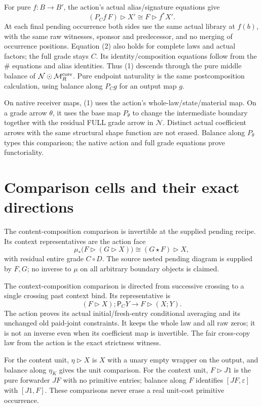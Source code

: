 \documentclass[11pt]{article}
\begin{document}
For pure $f:B\to B'$, the action's actual alias/signature equations give
\[
 (P_Cf\,F)\triangleright X'\cong
                F\triangleright f^*X'.                 \tag{2}
\]
At each final pending occurrence both sides use the same actual library at $f(b)$, with the same raw witnesses, sponsor and predecessor, and no merging of occurrence positions. Equation (2) also holds for complete laws and actual factors; the full grade stays $C$. Its identity/composition equations follow from the $\# $ equations and alias identities. Thus (1) descends through the pure middle balance of $\mathcal N\odot\mathcal M_R^{\rm core}$. Pure endpoint naturality is the same postcomposition calculation, using balance along $P_Cg$ for an output map $g$.

On native receiver maps, (1) uses the action's whole-law/state/material map. On a grade arrow $\theta$, it uses the base map $P_\theta$ to change the intermediate boundary together with the residual FULL grade arrow in $\mathcal N$. Distinct actual coefficient arrows with the same structural shape function are not erased. Balance along $P_\theta$ types this comparison; the native action and full grade equations prove functoriality.

\section{Comparison cells and their exact directions}
The content-composition comparison is invertible at the supplied pending recipe. Its context representatives are the action face
\[
 \mu_*\bigl(F\triangleright(G\triangleright X)\bigr)
          \cong (G\star F)\triangleright X,
\]
with residual entire grade $C\circ D$. The source nested pending diagram is supplied by $F,G$; no inverse to $\mu$ on all arbitrary boundary objects is claimed.

The context-composition comparison is directed from successive crossing to a single crossing past context bind. Its representative is
\[
 (F\triangleright X);\mathsf P_CY
                 \longrightarrow F\triangleright(X;Y).
\]
The action proves its actual initial/fresh-entry conditional averaging and its unchanged old paid-joint constraints. It keeps the whole law and all raw zeros; it is not an inverse even when its coefficient map is invertible. The fair cross-copy law from the action is the exact strictness witness.

For the content unit, $\eta\triangleright X$ is $X$ with a unary empty wrapper on the output, and balance along $\eta_K$ gives the unit comparison. For the context unit, $F\triangleright J1$ is the pure forwarder $JF$ with no primitive entries; balance along $F$ identifies $[JF,\varepsilon]$ with $[J1,F]$. These comparisons never erase a real unit-cost primitive occurrence.
\end{document}
